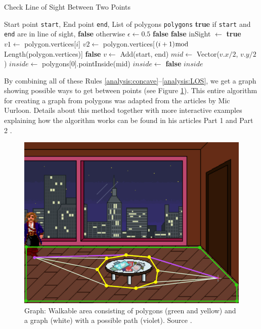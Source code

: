 \begin{algorithm}
\caption{Check Line of Sight Between Two Points}\label{alg:InLineOfSight}
\begin{algorithmic}[1]
\Require Start point \texttt{start}, End point \texttt{end}, List of polygons \texttt{polygons}
\Ensure \textbf{true} if \texttt{start} and \texttt{end} are in line of sight, \textbf{false} otherwise
\Statex
{}
    \State $\epsilon \gets 0.5$
        \State \Return \textbf{false}
    \EndIf
        \State \Return \textbf{false}
    \EndIf
    \State inSight $\gets$ \textbf{true}
            \State $v1 \gets$ polygon.vertices[$i$]
            \State $v2 \gets$ polygon.vertices[$(i+1) \bmod$ Length(polygon.vertices)]
                    \State \Return \textbf{false} 
                \EndIf
            \EndIf
        \EndFor
    \EndFor
    \State $v \gets$ Add(start, end)
    \State $mid \gets$ Vector($v.x / 2$, $v.y / 2$)
    \State $inside \gets$ polygons[0].pointInside(mid)
            \State $inside \gets$ \textbf{false}
        \EndIf
    \EndFor
    \State \Return $inside$
\EndFunction
\end{algorithmic}
\end{algorithm}

By combining all of these Rules \ref{analysis:concave}--\ref{analysis:LOS}, we get a graph showing possible ways to get between points (see Figure \ref{fig:Graph}). This entire algorithm for creating a graph from polygons was adapted from the articles by Mic Uurloon. Details about this method together with more interactive examples explaining how the algorithm works can be found in his articles Part 1 \cite{Uurloon1} and Part 2 \cite{Uurloon2}.

\begin{figure}[H]
\centering
\includegraphics[width=.7\linewidth]{img/WS-polygons3.png}
\caption{Graph: Walkable area consisting of polygons (green and yellow) and a graph (white) with a possible path (violet). Source \cite{Uurloon1}.}
\label{fig:Graph}
\end{figure}

